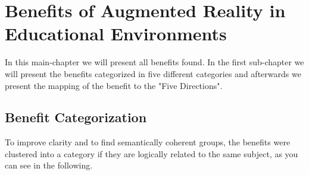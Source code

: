 \section{Benefits of Augmented Reality in Educational Environments}
In this main-chapter we will present all benefits found. In the first sub-chapter we will present the benefits categorized in five different categories and afterwards we present the mapping of the benefit to the "Five Directions".
\subsection{Benefit Categorization}
\label{subsec:Benefits}
To improve clarity and to find semantically coherent groups, the benefits were clustered into a category if they are logically related to the same subject, as you can see in the following.

% 
